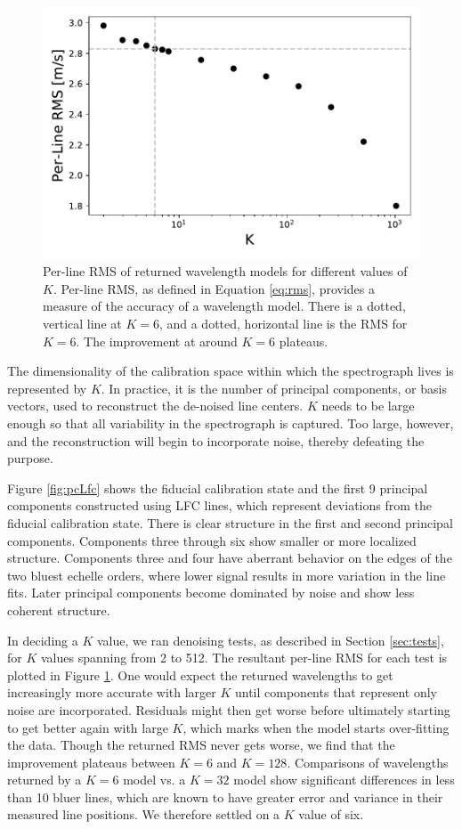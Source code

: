 \documentclass[twocolumn,table,xcolor,trackchanges]{aastex63}
\begin{document}
\begin{figure}[b]
\centering
\includegraphics[width=.45\textwidth]{Figures/kvals_all.pdf}
\caption{Per-line RMS of returned wavelength models for different values of $K$.  Per-line RMS, as defined in Equation \ref{eq:rms}, provides a measure of the accuracy of a wavelength model.  There is a dotted, vertical line at $K=6$, and a dotted, horizontal line is the RMS for $K=6$.  The improvement at around $K=6$ plateaus.}
\label{fig:kvals}
\end{figure}
\label{sec:choice_k}
The dimensionality of the calibration space within which the spectrograph lives is represented by $K$.  In practice, it is the number of principal components, or basis vectors, used to reconstruct the de-noised line centers.  $K$ needs to be large enough so that all variability in the spectrograph is captured.  Too large, however, and the reconstruction will begin to incorporate noise, thereby defeating the purpose.

Figure \ref{fig:pcLfc} shows the fiducial calibration state and the first 9 principal components constructed using LFC lines, which represent deviations from the fiducial calibration state.  There is clear structure in the first and second principal components.  Components three through six show smaller or more localized structure.  Components three and four have aberrant behavior on the edges of the two bluest echelle orders, where lower signal results in more variation in the line fits.  Later principal components become dominated by noise and show less coherent structure.

In deciding a $K$ value, we ran denoising tests, as described in Section \ref{sec:tests}, for $K$ values spanning from 2 to 512.  The resultant per-line RMS for each test is plotted in Figure \ref{fig:kvals}.  One would expect the returned wavelengths to get increasingly more accurate with larger $K$ until components that represent only noise are incorporated.  Residuals might then get worse before ultimately starting to get better again with large $K$, which marks when the model starts over-fitting the data.  Though the returned RMS never gets worse, we find that the improvement plateaus between $K=6$ and $K=128$.  Comparisons of wavelengths returned by a $K=6$ model vs. a $K=32$ model show significant differences in less than 10 bluer lines, which are known to have greater error and variance in their measured line positions.  We therefore settled on a $K$ value of six.
\end{document}
